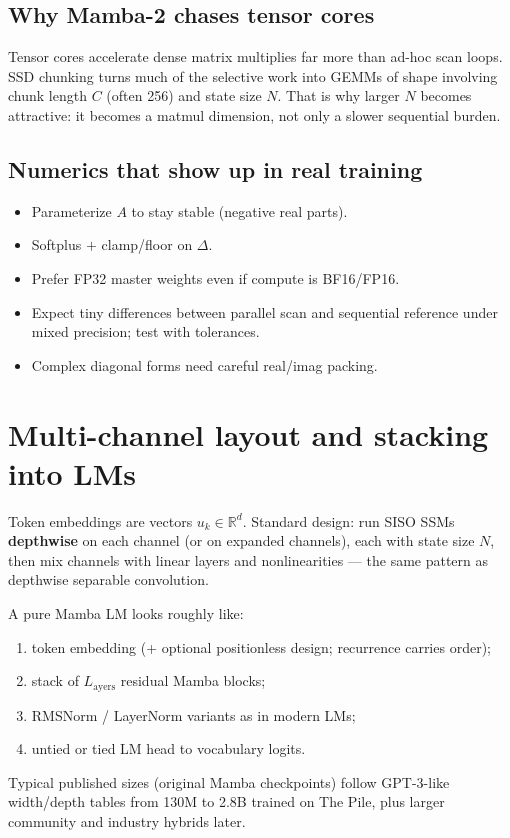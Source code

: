 \documentclass[11pt,a4paper]{article}
\begin{document}
\subsection{Why Mamba-2 chases tensor cores}

Tensor cores accelerate dense matrix multiplies far more than ad-hoc scan loops.
SSD chunking turns much of the selective work into GEMMs of shape involving chunk length $C$ (often 256) and state size $N$.
That is why larger $N$ becomes attractive: it becomes a matmul dimension, not only a slower sequential burden.

\subsection{Numerics that show up in real training}

\begin{itemize}[leftmargin=*]
  \item Parameterize $A$ to stay stable (negative real parts).
  \item Softplus $+$ clamp/floor on $\Delta$.
  \item Prefer FP32 master weights even if compute is BF16/FP16.
  \item Expect tiny differences between parallel scan and sequential reference under mixed precision; test with tolerances.
  \item Complex diagonal forms need careful real/imag packing.
\end{itemize}

\section{Multi-channel layout and stacking into LMs}

Token embeddings are vectors $u_k\in\mathbb{R}^{d}$.
Standard design: run SISO SSMs \textbf{depthwise} on each channel (or on expanded channels), each with state size $N$, then mix channels with linear layers and nonlinearities --- the same pattern as depthwise separable convolution.

A pure Mamba LM looks roughly like:
\begin{enumerate}[leftmargin=*]
  \item token embedding (+ optional positionless design; recurrence carries order);
  \item stack of $L_{\mathrm{ayers}}$ residual Mamba blocks;
  \item RMSNorm / LayerNorm variants as in modern LMs;
  \item untied or tied LM head to vocabulary logits.
\end{enumerate}
Typical published sizes (original Mamba checkpoints) follow GPT-3-like width/depth tables from 130M to 2.8B trained on The Pile, plus larger community and industry hybrids later.
\end{document}
